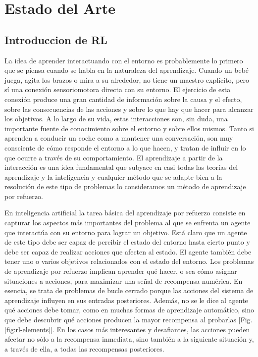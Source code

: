 \chapter{Estado del Arte}\label{chapter:state-of-the-art}

\section{Introduccion de RL}\label{section:state-of-the-art:introduction-to-RL}

La idea de aprender interactuando con el entorno es probablemente lo primero que se piensa cuando se habla en la naturaleza del aprendizaje. Cuando un bebé juega, agita los brazos o mira a su alrededor, no tiene un maestro explícito, pero sí una conexión sensoriomotora directa con su entorno. El ejercicio de esta conexión produce una gran cantidad de información sobre la causa y el efecto, sobre las consecuencias de las acciones y sobre lo que hay que hacer para alcanzar los objetivos. A lo largo de su vida, estas interacciones son, sin duda, una importante fuente de conocimiento sobre el entorno y sobre ellos mismos. Tanto si aprenden a conducir un coche como a mantener una conversación, son muy consciente de cómo responde el entorno a lo que hacen, y tratan de influir en lo que ocurre a través de su comportamiento. El aprendizaje a partir de la interacción es una idea fundamental que subyace en casi todas las teorías del aprendizaje y la inteligencia y cualquier método que se adapte bien a la resolución de este tipo de problemas lo consideramos un método de aprendizaje por refuerzo.


En inteligencia artificial la tarea básica del aprendizaje por refuerzo consiste en capturar los aspectos más importantes del problema al que se enfrenta un agente que interactúa con su entorno para lograr un objetivo. Está claro que un agente de este tipo debe ser capaz de percibir el estado del entorno hasta cierto punto y debe ser capaz de realizar acciones que afecten al estado. El agente también debe tener uno o varios objetivos relacionados con el estado del entorno. Los problemas de aprendizaje por refuerzo implican aprender qué hacer, o sea cómo asignar situaciones a acciones, para maximizar una señal de recompensa numérica. En esencia, se trata de problemas de bucle cerrado porque las acciones del sistema de aprendizaje influyen en sus entradas posteriores. Además, no se le dice al agente qué acciones debe tomar, como en muchas formas de aprendizaje automático, sino que debe descubrir qué acciones producen la mayor recompensa al probarlas [Fig. \ref{fig:rl-elements}]. En los casos más interesantes y desafiantes, las acciones pueden afectar no sólo a la recompensa inmediata, sino también a la siguiente situación y, a través de ella, a todas las recompensas posteriores.

